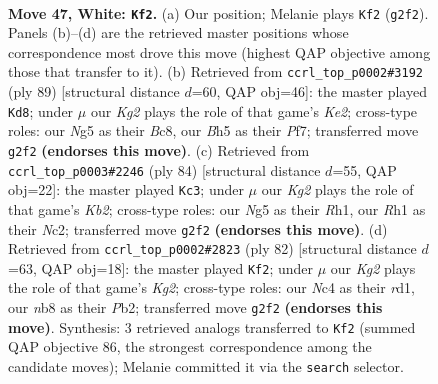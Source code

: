 \documentclass[11pt]{article}
\begin{document}
\clearpage

\begin{figure}[p]\centering
\begin{subfigure}{0.46\textwidth}\centering
\resizebox{\linewidth}{!}{%
\newchessgame
\chessboard[
  setfen={rnb5/1p2n1k1/4p3/5pNB/PpN2P2/1P4P1/6KP/7R w - - 1 47},
  showmover=false,
  pgfstyle=straightmove, color=movearrow, markmove={g2-f2}
]}
\caption{}
\end{subfigure}\hfill
\begin{subfigure}{0.46\textwidth}\centering
\resizebox{\linewidth}{!}{%
\newchessgame
\chessboard[
  setfen={2b5/p3kp2/1p1p2pp/3Pn3/2P3P1/P3K3/4B2P/6R1 b - - 11 45},
  showmover=false,
  pgfstyle=straightmove, color=movearrow, markmove={e7-d8}
]}
\caption{}
\end{subfigure}
\\[4pt]
\begin{subfigure}{0.46\textwidth}\centering
\resizebox{\linewidth}{!}{%
\newchessgame
\chessboard[
  setfen={5kb1/1p5p/p1nr1pp1/8/6P1/1P3P2/PKN1B1P1/7R w - - 0 43},
  showmover=false,
  pgfstyle=straightmove, color=movearrow, markmove={b2-c3}
]}
\caption{}
\end{subfigure}\hfill
\begin{subfigure}{0.46\textwidth}\centering
\resizebox{\linewidth}{!}{%
\newchessgame
\chessboard[
  setfen={5bk1/Rp3pp1/1Np1n2p/8/4P1P1/P1B2P1P/1P4K1/3r4 w - - 5 42},
  showmover=false,
  pgfstyle=straightmove, color=movearrow, markmove={g2-f2}
]}
\caption{}
\end{subfigure}
\caption{\textbf{Move 47, White: \texttt{Kf2}.} (a) Our position; Melanie plays \texttt{Kf2} (\texttt{g2f2}). Panels (b)--(d) are the retrieved master positions whose correspondence most drove this move (highest QAP objective among those that transfer to it). (b) Retrieved from \texttt{ccrl\_top\_p0002\#3192} (ply 89) [structural distance $d$=60, QAP obj=46]: the master played \texttt{Kd8}; under $\mu$ our \emph{Kg2} plays the role of that game's \emph{Ke2}; cross-type roles: our \emph{N}g5 as their \emph{B}c8, our \emph{B}h5 as their \emph{P}f7; transferred move \texttt{g2f2} \textbf{(endorses this move)}. (c) Retrieved from \texttt{ccrl\_top\_p0003\#2246} (ply 84) [structural distance $d$=55, QAP obj=22]: the master played \texttt{Kc3}; under $\mu$ our \emph{Kg2} plays the role of that game's \emph{Kb2}; cross-type roles: our \emph{N}g5 as their \emph{R}h1, our \emph{R}h1 as their \emph{N}c2; transferred move \texttt{g2f2} \textbf{(endorses this move)}. (d) Retrieved from \texttt{ccrl\_top\_p0002\#2823} (ply 82) [structural distance $d$=63, QAP obj=18]: the master played \texttt{Kf2}; under $\mu$ our \emph{Kg2} plays the role of that game's \emph{Kg2}; cross-type roles: our \emph{N}c4 as their \emph{r}d1, our \emph{n}b8 as their \emph{P}b2; transferred move \texttt{g2f2} \textbf{(endorses this move)}. Synthesis: 3 retrieved analogs transferred to \texttt{Kf2} (summed QAP objective 86, the strongest correspondence among the candidate moves); Melanie committed it via the \texttt{search} selector.}
\label{fig:thought-m92}
\end{figure}
\end{document}
